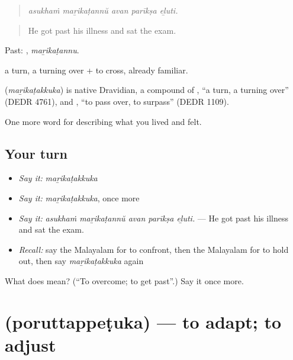 \begin{quote}
\emph{asukhaṁ maṟikaṭannŭ avan parīkṣa eḻuti.}
\end{quote}

\begin{quote}
He got past his illness and sat the exam.
\end{quote}

Past: , \emph{maṟikaṭannu}.

 a turn, a turning over +  to cross, already familiar.

\begin{cousinweb}
\textbf{} (\emph{maṟikaṭakkuka}) is native Dravidian, a compound of , \textquotedblleft{}a turn, a turning over\textquotedblright{} (DEDR 4761), and , \textquotedblleft{}to pass over, to surpass\textquotedblright{} (DEDR 1109).
\end{cousinweb}

\begin{grammarlens}[title={What you've built}]
One more word for describing what you lived and felt.
\end{grammarlens}

\subsection*{Your turn}
\begin{itemize}
\raggedright
  \item \emph{Say it:} \emph{maṟikaṭakkuka}
  \item \emph{Say it:} \emph{maṟikaṭakkuka}, once more
  \item \emph{Say it:} \emph{asukhaṁ maṟikaṭannŭ avan parīkṣa eḻuti.} — He got past his illness and sat the exam.
  \item \emph{Recall:} say the Malayalam for to confront, then the Malayalam for to hold out, then say \emph{maṟikaṭakkuka} again
\end{itemize}

\begin{tcolorbox}[breakable,colback=teal!4,colframe=teal!35!black,title={Before you move on}]
What does  mean? (\textquotedblleft{}To overcome; to get past\textquotedblright{}.) Say it once more.
\end{tcolorbox}
\section[\texorpdfstring{\ml{പൊരുത്തപ്പെടുക} (poruttappeṭuka)}{പൊരുത്തപ്പെടുക (poruttappeṭuka)}]{ (poruttappeṭuka) — to adapt; to adjust}

